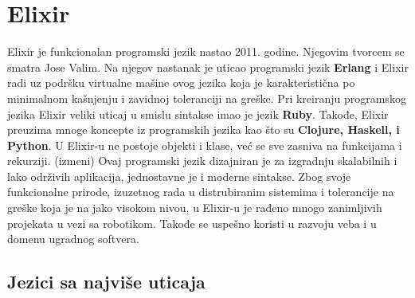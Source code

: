 \documentclass[12pt,oneside]{memoir}
\begin{document}
\frontmatter
\naslovna
\komisija
\apstrakt
\tableofcontents*

\mainmatter

\chapter{Elixir} %

Elixir je funkcionalan programski jezik nastao 2011. godine. Njegovim tvorcem se smatra Jose Valim. Na njegov nastanak je uticao programski jezik \textbf{Erlang} i Elixir radi uz podršku virtualne mašine ovog jezika koja je karakteristična po minimalnom kašnjenju i zavidnoj toleranciji na greške. Pri kreiranju programskog jezika Elixir veliki uticaj u smislu sintakse imao je jezik \textbf{Ruby}. Takođe, Elixir preuzima mnoge koncepte iz programskih jezika kao što su \textbf{Clojure, Haskell, i Python}. U Elixir-u ne postoje objekti i klase, već se sve zasniva na funkcijama i rekurziji. (izmeni) Ovaj programski jezik dizajniran je za izgradnju skalabilnih i lako održivih aplikacija, jednostavne je i moderne sintakse. Zbog svoje funkcionalne prirode, izuzetnog rada u distrubiranim sistemima i tolerancije na greške koja je na jako visokom nivou, u Elixir-u je rađeno mnogo zanimljivih projekata u vezi sa robotikom. Takođe se uspešno koristi u razvoju veba i u domenu ugradnog softvera.

\section{Jezici sa najviše uticaja}
\end{document}
